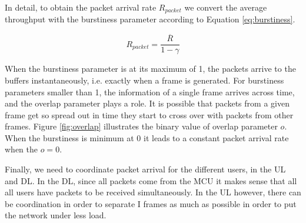 
In detail, to obtain the packet arrival rate $R_{packet}$ we convert the average throughput with the burstiness parameter according to Equation \eqref{eq:burstiness}.

\begin{equation} \label{eq:burstiness}
    R_{packet} = \frac{\overline{R}}{1 - \gamma}
\end{equation}

When the burstiness parameter is at its maximum of 1, the packets arrive to the buffers instantaneously, i.e. exactly when a frame is generated. For burstiness parameters smaller than 1, the information of a single frame arrives across time, and the overlap parameter plays a role. It is possible that packets from a given frame get so spread out in time they start to cross over with packets from other frames. Figure \ref{fig:overlap} illustrates the binary value of overlap parameter $o$. When the burstiness is minimum at 0 it leads to a constant packet arrival rate when the $o = 0$.



Finally, we need to coordinate packet arrival for the different users, in the \acs{UL} and \acs{DL}. In the \acs{DL}, since all packets come from the \acs{MCU} it makes sense that all all users have packets to be received simultaneously. In the UL however, there can be coordination in order to separate I frames as much as possible in order to put the network under less load.

